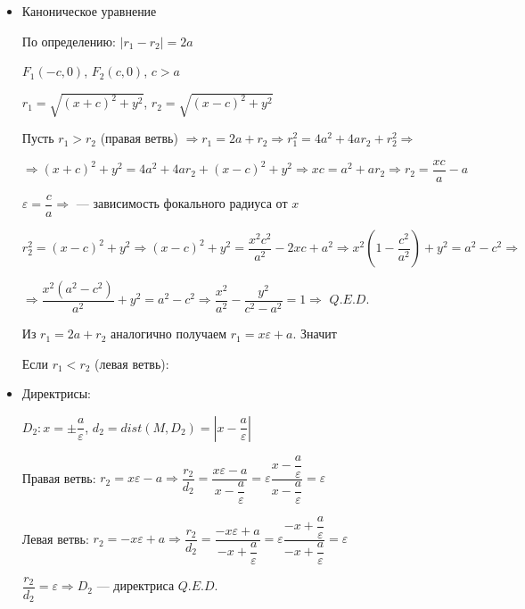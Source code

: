 \begin{itemize}
    \item Каноническое уравнение

          По определению: \(|r_1 - r_2| = 2a\)

          \(F_1(-c, 0)\), \(F_2(c, 0)\), \(c > a\)

          \(r_1 = \sqrt{(x + c)^2 + y^2}\), \(r_2 = \sqrt{(x - c)^2 + y^2}\)

          Пусть \(r_1 > r_2\) (правая ветвь) \(\Rightarrow r_1 = 2a + r_2 \Rightarrow r_1^2 = 4a^2 + 4ar_2 + r_2^2 \Rightarrow\)

          \(\Rightarrow (x + c)^2 + y^2 = 4a^2 + 4ar_2 + (x - c)^2 + y^2 \Rightarrow xc = a^2 + ar_2 \Rightarrow r_2 = \dfrac{xc}{a} - a\)

          \(\varepsilon = \dfrac{c}{a} \Rightarrow\)  --- зависимость фокального радиуса от \(x\)

          \(r_2^2 = (x - c)^2 + y^2 \Rightarrow (x - c)^2 + y^2 = \dfrac{x^2 c^2}{a^2} - 2xc + a^2 \Rightarrow x^2\left(1 - \dfrac{c^2}{a^2}\right) + y^2 = a^2 - c^2 \Rightarrow\)

          \(\Rightarrow \dfrac{x^2(a^2 - c^2)}{a^2} + y^2 = a^2 - c^2 \Rightarrow \dfrac{x^2}{a^2} - \dfrac{y^2}{c^2 - a^2} = 1 \Rightarrow\)  \(Q.E.D.\)

          Из \(r_1 = 2a + r_2\) аналогично получаем \(r_1 = x \varepsilon + a\). Значит 

          Если \(r_1 < r_2\) (левая ветвь): 

    \item Директрисы:

          \(D_2: x = \pm \dfrac{a}{\varepsilon}\), \(d_2 = dist(M, D_2) = \left|x - \dfrac{a}{\varepsilon}\right|\)

          Правая ветвь: \(r_2 = x \varepsilon - a \Rightarrow \dfrac{r_2}{d_2} = \dfrac{x \varepsilon - a}{x - \dfrac{a}{\varepsilon}} = \varepsilon \dfrac{x - \dfrac{a}{\varepsilon}}{x - \dfrac{a}{\varepsilon}} = \varepsilon\)

          Левая ветвь: \(r_2 = -x \varepsilon + a \Rightarrow \dfrac{r_2}{d_2} = \dfrac{-x \varepsilon + a}{-x + \dfrac{a}{\varepsilon}} = \varepsilon \dfrac{-x + \dfrac{a}{\varepsilon}}{-x + \dfrac{a}{\varepsilon}} = \varepsilon\)

          \(\dfrac{r_2}{d_2} = \varepsilon \Rightarrow D_2\) --- директриса \(Q.E.D.\)


\end{itemize}
